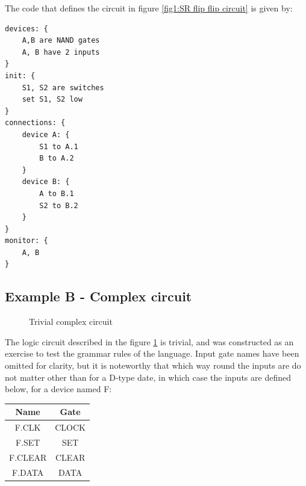 \documentclass[12pt]{article}
\begin{document}
The code that defines the circuit in figure \ref{fig1:SR flip flip circuit} is given by:


\begin{minipage}{\linewidth}
\begin{lstlisting}
devices: {
    A,B are NAND gates
    A, B have 2 inputs
}
init: {
    S1, S2 are switches
    set S1, S2 low
}
connections: {
    device A: {
        S1 to A.1
        B to A.2
    }
    device B: {
        A to B.1
        S2 to B.2
    }
}
monitor: {
    A, B
}
\end{lstlisting}
\end{minipage}

\subsection{Example B - Complex circuit}
 \begin{figure} [ht]
\begin{center}
\caption{Trivial complex circuit}
\label{fig2:trivial complex circuit}
\end{center}
\end{figure}

The logic circuit described in the figure \ref{fig2:trivial complex circuit} is trivial, and was constructed as an exercise to test the grammar rules of the language. Input gate names have been omitted for clarity, but it is noteworthy that which way round the inputs are do not matter other than for a D-type date, in which case the inputs are defined below, for a device named F: \\
\begin{center}
\begin{tabular}{|c c|}
\hline 
    Name & Gate\\
    \hline  
    F.CLK & CLOCK\\
    F.SET & SET \\
    F.CLEAR & CLEAR\\
    F.DATA & DATA  \\
    \hline 
\end{tabular}
\end{center}
\end{document}
